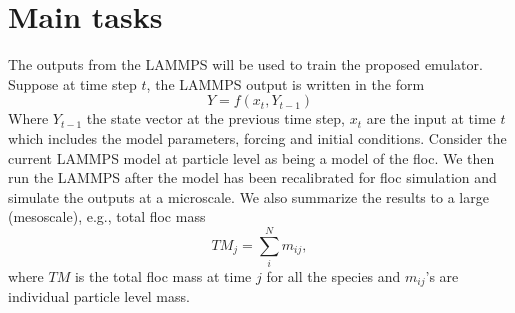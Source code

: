 \documentclass[12pt,titlepage]{report}
\theoremstyle{definition}
\theoremstyle{remark}
\begin{document}
\section{Main tasks}
The outputs from the LAMMPS will be used to train the proposed emulator. Suppose at time step $t$, the LAMMPS output is written in the form 
\begin{equation}
Y=f(x_t,Y_{t-1})
\end{equation}
Where $Y_{t-1}$ the state vector at the previous time step, $x_t$ are the input at time $t$ which includes the model parameters, forcing and initial conditions.
Consider the current LAMMPS model at particle level as being a model of the floc. We then run the LAMMPS after the model has been recalibrated for floc simulation and simulate the outputs at a microscale. We also summarize the results to a large (mesoscale), e.g., total floc mass 
\begin{equation}
TM_j =\sum^N_i m_{ij},
\end{equation} where $TM$ is the total floc mass at time $j$ for all the species and $m_{ij}$'s are individual particle level mass. 
\end{document}
